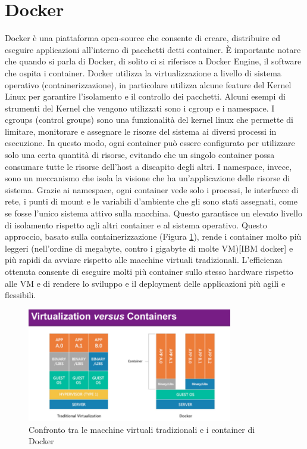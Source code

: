 \section{Docker}
\label{sec:docker}
Docker è una piattaforma open-source che consente di creare, distribuire ed eseguire applicazioni all'interno di pacchetti detti container. È importante notare che quando si parla di Docker, di solito ci si riferisce a Docker Engine, il software che ospita i container. Docker utilizza la virtualizzazione a livello di sistema operativo (containerizzazione), in particolare utilizza alcune feature del Kernel Linux per garantire l’isolamento e il controllo dei pacchetti. Alcuni esempi di strumenti del Kernel che vengono utilizzati sono i cgroup e i namespace. I cgroups (control groups) sono una funzionalità del kernel linux che permette di limitare, monitorare e assegnare le risorse del sistema ai diversi processi in esecuzione. In questo modo, ogni container può essere configurato per utilizzare solo una certa quantità di risorse, evitando che un singolo container possa consumare tutte le risorse dell’host a discapito degli altri.
I namespace, invece, sono un meccanismo che isola la visione che ha un’applicazione delle risorse di sistema. Grazie ai namespace, ogni container vede solo i processi, le interfacce di rete, i punti di mount e le variabili d’ambiente che gli sono stati assegnati, come se fosse l'unico sistema attivo sulla macchina. Questo garantisce un elevato livello di isolamento rispetto agli altri container e al sistema operativo. Questo approccio, basato sulla containerizzazione (Figura \ref{fig:docker_containerization}), rende i container molto più leggeri (nell’ordine di megabyte, contro i gigabyte di molte VM)[IBM docker] e più rapidi da avviare rispetto alle macchine virtuali tradizionali. L’efficienza ottenuta consente di eseguire molti più container sullo stesso hardware rispetto alle VM e di rendere lo sviluppo e il deployment delle applicazioni più agili e flessibili.

\begin{figure}[h]
    \centering
    \includegraphics[width=0.8\textwidth]{img/contvsvirt.png}
    \caption{Confronto tra le macchine virtuali tradizionali e i container di Docker}
    \label{fig:docker_containerization}
\end{figure}

